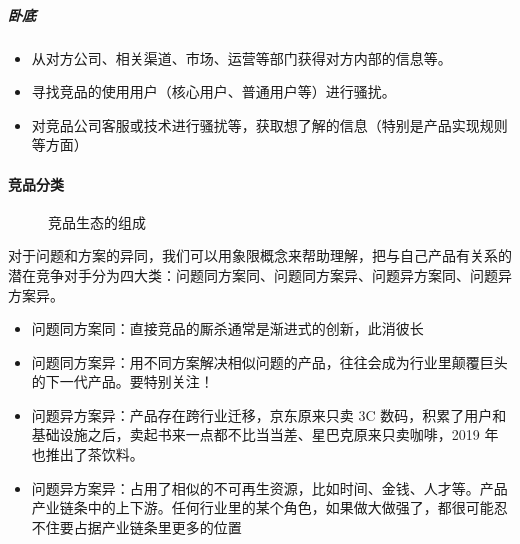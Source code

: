 \documentclass[letterpaper,10pt,english]{sphinxmanual}
\begin{document}
\subparagraph{卧底}
\label{\detokenize{chapter_knowledge/goods_analysis:id14}}\begin{itemize}
\item {} 
从对方公司、相关渠道、市场、运营等部门获得对方内部的信息等。

\item {} 
寻找竞品的使用用户（核心用户、普通用户等）进行骚扰。

\item {} 
对竞品公司客服或技术进行骚扰等，获取想了解的信息（特别是产品实现规则等方面）%
\begin{footnote}[527]\sphinxAtStartFootnote
{}
%
\end{footnote}

\end{itemize}


\paragraph{竞品分类}
\label{\detokenize{chapter_knowledge/goods_analysis:id15}}
\begin{figure}[H]
\centering
\capstart

\noindent{}
\caption{竞品生态的组成}\label{\detokenize{chapter_knowledge/goods_analysis:id32}}\end{figure}

对于问题和方案的异同，我们可以用象限概念来帮助理解，把与自己产品有关系的潜在竞争对手分为四大类：问题同方案同、问题同方案异、问题异方案同、问题异方案异。
\begin{itemize}
\item {} 
问题同方案同：直接竞品的厮杀通常是渐进式的创新，此消彼长

\item {} 
问题同方案异：用不同方案解决相似问题的产品，往往会成为行业里颠覆巨头的下一代产品。要特别关注！

\item {} 
问题异方案异：产品存在跨行业迁移，京东原来只卖 3C
数码，积累了用户和基础设施之后，卖起书来一点都不比当当差、星巴克原来只卖咖啡，2019
年也推出了茶饮料。

\item {} 
问题异方案异：占用了相似的不可再生资源，比如时间、金钱、人才等。产品产业链条中的上下游。任何行业里的某个角色，如果做大做强了，都很可能忍不住要占据产业链条里更多的位置

\end{itemize}
\end{document}
